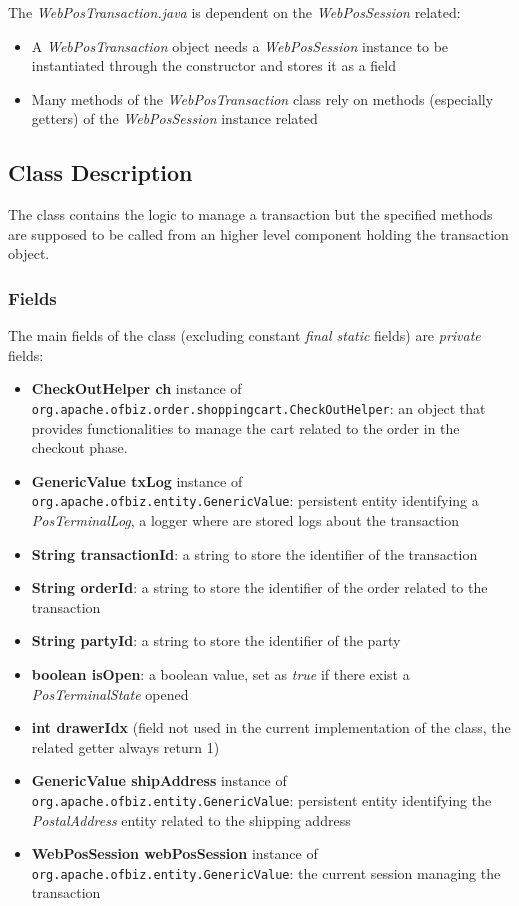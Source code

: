 The \emph{WebPosTransaction.java} is dependent on the \emph{WebPosSession} related:
\begin{itemize}
	\item A \emph{WebPosTransaction} object needs a \emph{WebPosSession} instance to be instantiated  through the constructor and stores it as a field
	\item Many methods of the \emph{WebPosTransaction} class rely on methods (especially getters) of the \emph{WebPosSession} instance related
\end{itemize}

\subsection{Class Description}
The class contains the logic to manage a transaction but the specified methods are supposed to be called from an higher level component holding the transaction object.

\subsubsection{Fields}
The main fields of the class (excluding constant \emph{final static} fields)  are \emph{private} fields:

\begin{itemize}
    \item \textbf{CheckOutHelper ch} instance of \\ \texttt{org.apache.ofbiz.order.shoppingcart.CheckOutHelper}: an object that provides functionalities to manage the cart related to the order in the checkout phase.
    \item \textbf{GenericValue txLog} instance of \\ \texttt{org.apache.ofbiz.entity.GenericValue}: persistent entity identifying a \emph{PosTerminalLog}, a logger where are stored logs about the transaction
    \item \textbf{String transactionId}: a string to store the identifier of the transaction
    \item \textbf{String orderId}: a string to store the identifier of the order related to the transaction
    \item \textbf{String partyId}: a string to store the identifier of the party
    \item \textbf{boolean isOpen}: a boolean value, set as \emph{true} if there exist a \emph{PosTerminalState} opened
    \item \textbf{int drawerIdx} (field not used in the current implementation of the class, the related getter always return 1)
    \item \textbf{GenericValue shipAddress} instance of \\ \texttt{org.apache.ofbiz.entity.GenericValue}: persistent entity identifying the \emph{PostalAddress} entity related to the shipping address
    \item \textbf{WebPosSession webPosSession} instance of \\ \texttt{org.apache.ofbiz.entity.GenericValue}: the current session managing the transaction
\end{itemize}

